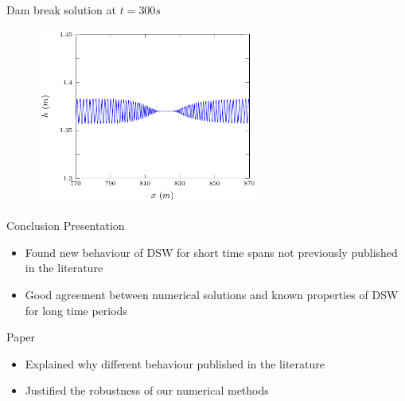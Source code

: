 \documentclass[pdf]{beamer}
\begin{document}
\begin{frame}{Dam break solution at $t=300s$}
	\begin{figure}
		\includegraphics[width=0.65\textwidth]{./Pictures/Results/Example/F300.pdf}
	\end{figure}
	
\end{frame}



\begin{frame}{Conclusion}
	Presentation
	\begin{itemize}
		\item Found new behaviour of DSW for short time spans not previously published in the literature
		\item Good agreement between numerical solutions and known properties of DSW for long time periods
	\end{itemize}
	Paper
		\begin{itemize}
			\item Explained why different behaviour published in the literature
			\item Justified the robustness of our numerical methods
		\end{itemize}
\end{frame}
\end{document}
